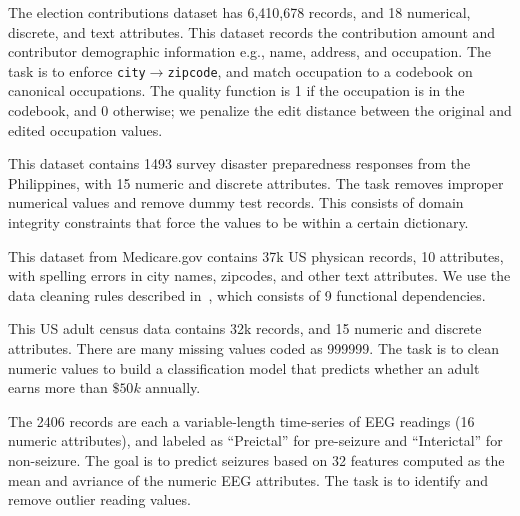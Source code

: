 
 The election contributions dataset has 6,410,678 records, and 18 numerical, discrete, and text attributes. This dataset records the contribution amount and contributor demographic information e.g., name, address, and occupation.  The task is to enforce \texttt{city$\rightarrow$zipcode}, and match occupation to a codebook on canonical occupations.  The quality function is 1 if the occupation is in the codebook, and 0 otherwise; we penalize the edit distance between the original and edited occupation values.



 This dataset contains 1493 survey disaster preparedness responses from the Philippines, with 15 numeric and discrete attributes. The task removes improper numerical values and remove dummy test records. This consists of domain integrity constraints that force the values to be within a certain dictionary.

 This dataset from Medicare.gov contains 37k US physican records, 10 attributes, with spelling errors in city names, zipcodes, and other text attributes. We use the data cleaning rules described in~\cite{rekatsinas2017holoclean}, which consists of 9 functional dependencies. 

 This US adult census data contains 32k records, and 15 numeric and discrete attributes.  There are many missing values coded as 999999.  The task is to clean numeric values to build a classification model that predicts whether an adult earns more than $\$50k$ annually. 

  The 2406 records are each a variable-length time-series of EEG readings (16 numeric attributes), and labeled as ``Preictal'' for pre-seizure and ``Interictal'' for non-seizure.  The goal is to predict seizures based on 32 features computed as the mean and avriance of the numeric EEG attributes.  The task is to identify and remove outlier reading values.  

